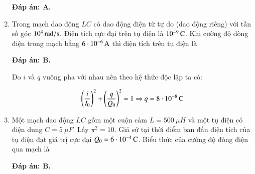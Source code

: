 \begin{enumerate}[label=\bfseries Câu \arabic*:]
{		
	}
	\hideall
	{		\textbf{Đáp án: A.}
		
		
		
	}
		\item {} 
	
	{ Trong mạch dao động $LC$ có dao động điện từ tự do (dao động riêng) với tần số góc $\xsi{10^4}{rad/s}$. Điện tích cực đại trên tụ điện là  $\xsi{10^{-9}}{C}$. Khi cường độ dòng điện trong mạch bằng $\xsi{6\cdot 10^{-6}}{A}$ thì điện tích trên tụ điện là
		
	}
	\hideall
	{		\textbf{Đáp án: B.}
		
		Do $i$ và $q$ vuông pha với nhau nên theo hệ thức độc lập ta có:
		
		$$\left(\dfrac{i}{I_0}\right)^2 +\left(\dfrac{q}{Q_0}\right)^2 =1 \Rightarrow q = \xsi{8 \cdot 10^{-8}}{C} $$
		
		
		
	}
		\item {} 
	
	{Một mạch dao động $LC$ gồm một cuộn cảm $L=\SI{500}{\mu H}$ và một tụ điện có điện dung $C = \SI{5}{\mu F}$. Lấy $\pi^2 = 10$. Giả sử tại thời điểm ban đầu điện tích của tụ điện đạt giá trị cực đại $Q_0 = \xsi{6 \cdot 10^{-4}}{C}$. Biểu thức của cường độ đòng điện qua mạch là
		
		
	}
	\hideall
	{		\textbf{Đáp án: B.}
		
}
\end{enumerate}
